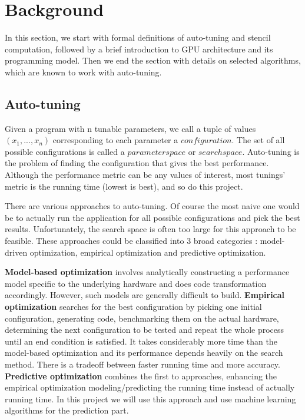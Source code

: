 \section{Background}
In this section, we start with formal definitions of auto-tuning and stencil computation, followed by a brief introduction to GPU architecture and its programming model. Then we end the section with details on selected algorithms, which are known to work with auto-tuning.

\subsection{Auto-tuning}
Given a program with n tunable parameters, we call a tuple of values $(x_1, ..., x_n)$ corresponding to each parameter a $configuration$. The set of all possible configurations is called a $parameter space$ or $search space$. Auto-tuning  is the problem of finding the configuration that gives the best performance. Although the performance metric can be any values of interest, most tunings' metric is the running time (lowest is best), and so do this project.

There are various approaches to auto-tuning. Of course the most naive one would be to actually run the application for all possible configurations and pick the best results. Unfortunately, the search space is often too large for this approach to be feasible. These approaches could be classified into 3 broad categories \cite{inpar}: model-driven optimization, empirical optimization and predictive optimization.

\textbf{Model-based optimization} involves analytically constructing a performance model specific to the underlying hardware and does code transformation accordingly. However, such models are generally difficult to build. \textbf{Empirical optimization} searches for the best configuration by picking one initial configuration, generating code, benchmarking them on the actual hardware, determining the next configuration to be tested and repeat the whole process until an end condition is satisfied. It takes considerably more time than the model-based optimization and its performance depends heavily on the search method. There is a tradeoff between faster running time and more accuracy. \textbf{Predictive optimization} combines the first to approaches, enhancing the empirical optimization modeling/predicting the running time instead of actually running time. In this project we will use this approach and use machine learning algorithms for the prediction part.

